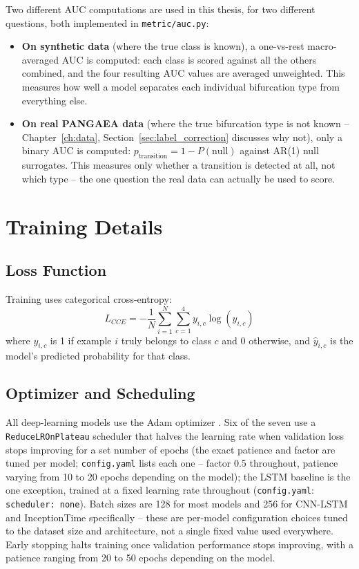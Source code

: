 Two different AUC computations are used in this thesis, for two different questions, both implemented in \texttt{metric/auc.py}:

\begin{itemize}
    \item \textbf{On synthetic data} (where the true class is known), a one-vs-rest macro-averaged AUC is computed: each class is scored against all the others combined, and the four resulting AUC values are averaged unweighted. This measures how well a model separates each individual bifurcation type from everything else.
    \item \textbf{On real PANGAEA data} (where the true bifurcation type is not known -- Chapter~\ref{ch:data}, Section~\ref{sec:label_correction} discusses why not), only a binary AUC is computed: $p_{\text{transition}} = 1 - P(\text{null})$ against AR(1) null surrogates. This measures only whether a transition is detected at all, not which type -- the one question the real data can actually be used to score.
\end{itemize}

\section{Training Details}
\label{sec:hyperparameters}

\subsection{Loss Function}

Training uses categorical cross-entropy:
\begin{equation}
    L_{CCE} = -\frac{1}{N}\sum_{i=1}^{N}\sum_{c=1}^{4} y_{i,c}\log(\hat{y}_{i,c})
\end{equation}
where $y_{i,c}$ is 1 if example $i$ truly belongs to class $c$ and 0 otherwise, and $\hat{y}_{i,c}$ is the model's predicted probability for that class.

\subsection{Optimizer and Scheduling}

All deep-learning models use the Adam optimizer \citep{kingma2015adam}. Six of the seven use a \texttt{ReduceLROnPlateau} scheduler that halves the learning rate when validation loss stops improving for a set number of epochs (the exact patience and factor are tuned per model; \texttt{config.yaml} lists each one -- factor 0.5 throughout, patience varying from 10 to 20 epochs depending on the model); the LSTM baseline is the one exception, trained at a fixed learning rate throughout (\texttt{config.yaml}: \texttt{scheduler: none}). Batch sizes are 128 for most models and 256 for CNN-LSTM and InceptionTime specifically -- these are per-model configuration choices tuned to the dataset size and architecture, not a single fixed value used everywhere. Early stopping halts training once validation performance stops improving, with a patience ranging from 20 to 50 epochs depending on the model.

